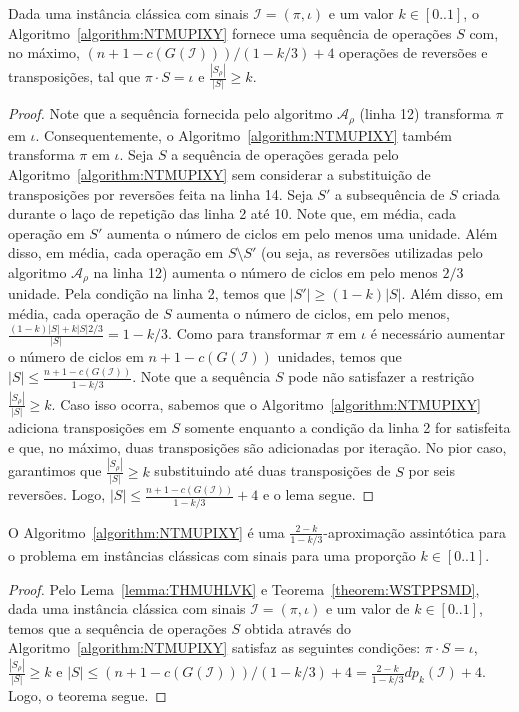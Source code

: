 \begin{lemma}\label{lemma:THMUHLVK}
Dada uma instância clássica com sinais $\mathcal{I} = (\pi,\iota)$ e um valor $k \in [0..1]$, o Algoritmo~\ref{algorithm:NTMUPIXY} fornece uma sequência de operações $S$ com, no máximo, $(n+1-c(G(\mathcal{I}))) / (1-k/3) + 4$ operações de reversões e transposições, tal que $\pi \cdot S = \iota$ e $\frac{|S_{\rho}|}{|S|} \ge k$. 
\end{lemma}
\begin{proof}
Note que a sequência fornecida pelo algoritmo $\mathcal{A}_\rho$ (linha 12) transforma $\pi$ em $\iota$. Consequentemente, o Algoritmo~\ref{algorithm:NTMUPIXY} também transforma $\pi$ em $\iota$.
Seja $S$ a sequência de operações gerada pelo Algoritmo~\ref{algorithm:NTMUPIXY} sem considerar a substituição de transposições por reversões feita na linha 14. Seja $S'$ a subsequência de $S$ criada durante o laço de repetição das linha 2 até 10. Note que, em média, cada operação em $S'$ aumenta o número de ciclos em pelo menos uma unidade. Além disso, em média, cada operação em $S \setminus S'$ (ou seja, as reversões utilizadas pelo algoritmo $\mathcal{A}_\rho$ na linha 12) aumenta o número de ciclos em pelo menos $2/3$ unidade. Pela condição na linha 2, temos que $|S'| \ge (1-k) |S|$. Além disso, em média, cada operação de $S$ aumenta o número de ciclos, em pelo menos, $\frac{(1-k)|S| + k|S|2/3}{|S|} = 1 - k/3$. Como para transformar $\pi$ em $\iota$ é necessário aumentar o número de ciclos em $n+1-c(G(\mathcal{I}))$ unidades, temos que $|S| \le \frac{n+1-c(G(\mathcal{I}))}{1-k/3}$. Note que a sequência $S$ pode não satisfazer a restrição $\frac{|S_{\rho}|}{|S|} \ge k$. Caso isso ocorra, sabemos que o Algoritmo~\ref{algorithm:NTMUPIXY} adiciona transposições em $S$ somente enquanto a condição da linha 2 for satisfeita e que, no máximo, duas transposições são adicionadas por iteração. No pior caso, garantimos que $\frac{|S_{\rho}|}{|S|} \ge k$ substituindo até duas transposições de $S$ por seis reversões. Logo, $|S| \le \frac{n+1-c(G(\mathcal{I}))}{1-k/3} + 4$ e o lema segue.
\end{proof}

\begin{theorem}\label{theorem:VWZUZNOR}
O Algoritmo~\ref{algorithm:NTMUPIXY} é uma $\frac{2-k}{1-k/3}$-aproximação assintótica para o problema \SbPRT{} em instâncias clássicas com sinais para uma proporção $k \in [0..1]$.
\end{theorem}
\begin{proof}
Pelo Lema~\ref{lemma:THMUHLVK} e Teorema~\ref{theorem:WSTPPSMD}, dada uma instância clássica com sinais $\mathcal{I} = (\pi,\iota)$ e um valor de $k \in [0..1]$, temos que a sequência de operações $S$ obtida através do Algoritmo~\ref{algorithm:NTMUPIXY} satisfaz as seguintes condições: $\pi \cdot S = \iota$, $\frac{|S_{\rho}|}{|S|} \ge k$ e $|S| \le (n+1-c(G(\mathcal{I}))) / (1-k/3) + 4 = \frac{2-k}{1-k/3} dp_k(\mathcal{I}) + 4$. Logo, o teorema segue.
\end{proof}

